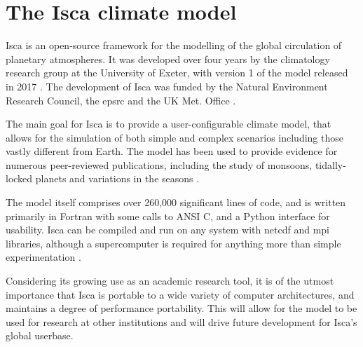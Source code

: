 \documentclass[a4paper,11pt]{report}
\begin{document}
\section{The Isca climate model}
Isca is an open-source framework for the modelling of the global circulation of planetary atmospheres. It was developed over four years by the climatology research group at the University of Exeter, with version 1 of the model released in 2017 \cite{vallis2018isca}. The development of Isca was funded by the Natural Environment Research Council, the \gls{epsrc} and the UK Met. Office \cite{vallis2018isca}.
\par
The main goal for Isca is to provide a user-configurable climate model, that allows for the simulation of both simple and complex scenarios including those vastly different from Earth. The model has been used to provide evidence for numerous peer-reviewed publications, including the study of monsoons, tidally-locked planets and variations in the seasons  \cite{penn2017thermal, thomson2018atmospheric, geen2018regime}.
 \par
 The model itself comprises over 260,000 significant lines of code, and is written primarily in Fortran with some calls to ANSI C, and a Python interface for usability. Isca can be compiled and run on any system with \gls{netcdf} and \gls{mpi} libraries, although a supercomputer is required for anything more than simple experimentation \cite{vallis2018isca}. 
 \par
Considering its growing use as an academic research tool, it is of the utmost importance that Isca is portable to a wide variety of computer architectures, and maintains a degree of performance portability. This will allow for the model to be used for research at other institutions and will drive future development for Isca's global userbase.
\end{document}
